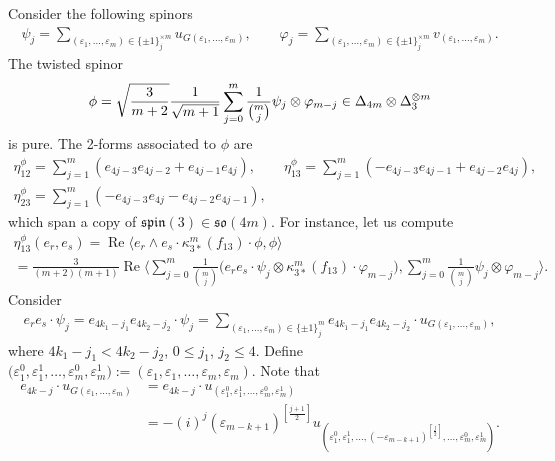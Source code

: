 \documentclass[10pt,a4paper]{amsart}
\numberwithin{equation}{section}
\begin{document}
Consider the following spinors
\begin{gather*}
\psi_j = \sum_{(\varepsilon_1,\dots,\varepsilon_m)\in\{\pm1\}_j^{\times m}} u_{G(\varepsilon_1,\dots,\varepsilon_m)}, \qquad
\varphi_j =\sum_{(\varepsilon_1,\dots,\varepsilon_m)\in\{\pm1\}_j^{\times m}}v_{(\varepsilon_1,\dots,\varepsilon_m)}.
\end{gather*}
The twisted spinor
\begin{gather}
\phi=\sqrt{3\over m+2}{1\over \sqrt{m+1}}\sum_{j=0}^m {1\over {m\choose j}} \psi_j\otimes\varphi_{m-j} \in \Delta_{4m}\otimes\Delta_3^{\otimes m} \label{eq: rank 3 pure spinor}
\end{gather}
is pure. The 2-forms associated to $\phi$ are
\begin{gather*}
 \eta_{12}^\phi = \sum_{j=1}^{m} (e_{4j-3}e_{4j-2}+e_{4j-1}e_{4j}),\qquad
 \eta_{13}^\phi = \sum_{j=1}^{m} (-e_{4j-3}e_{4j-1}+e_{4j-2}e_{4j}),\\
 \eta_{23}^\phi = \sum_{j=1}^{m} (-e_{4j-3}e_{4j}-e_{4j-2}e_{4j-1}),
\end{gather*}
which span a copy of $\mathfrak{spin}(3)\in \mathfrak{so}(4m)$. For instance, let us compute
\begin{gather*}
\eta_{13}^{\phi}(e_r,e_s) = \operatorname{Re}\big\langle e_r \wedge e_s \cdot \kappa_{3\ast}^{m}(f_{13})\cdot
\phi,\phi\big\rangle \\
{} = \frac{3}{(m+2)(m+1)}\operatorname{Re}\bigg \langle \sum_{j=0}^{m}\frac{1}{{m\choose j}}
\big(e_re_s\cdot\psi_{j}\otimes\kappa_{3\ast}^{m}(f_{13})\cdot\varphi_{m-j}\big), \sum_{j=0}^{m}\frac{1}{{m\choose
j}}\psi_{j}\otimes\varphi_{m-j}\bigg\rangle .
\end{gather*}
Consider
\begin{gather*}
e_re_s\cdot\psi_{j} = e_{4k_1-j_1}e_{4k_2-j_2}\cdot\psi_{j}= \sum_{(\varepsilon_{1},\dots, \varepsilon_{m})\in\{\pm
1\}_{j}^{m}}e_{4k_1-j_1}e_{4k_2-j_2}\cdot u_{G(\varepsilon_1,\dots,\varepsilon_m)},
\end{gather*}
where $4k_1-j_1< 4k_2-j_2$, $0\leq j_1$, $j_2\leq 4$. Define $\big(\varepsilon_1^{0},\varepsilon_1^{1},\dots,
\varepsilon_m^{0},\varepsilon_m^{1} \big):=(\varepsilon_{1},\varepsilon_1 ,\dots, \varepsilon_{m},\varepsilon_m )$. Note that
\begin{align*}
e_{4k-j}\cdot u_{G(\varepsilon_{1},\dots,\varepsilon_m)} &= e_{4k-j}\cdot u_{(\varepsilon_{1}^0,\varepsilon_{1}^{1},\dots,\varepsilon_{m}^{0},\varepsilon_{m}^{1})}\\
&= -(i)^j(\varepsilon_{m-k+1})^{[\frac{j+1}{2}]} u_{(\varepsilon_{1}^0,\varepsilon_{1}^1,\dots,(-\varepsilon_{m-k+1})^{[\frac{j}{2}]},\dots,\varepsilon_{m}^0, \varepsilon_{m}^1)}.
\end{align*}
\end{document}

